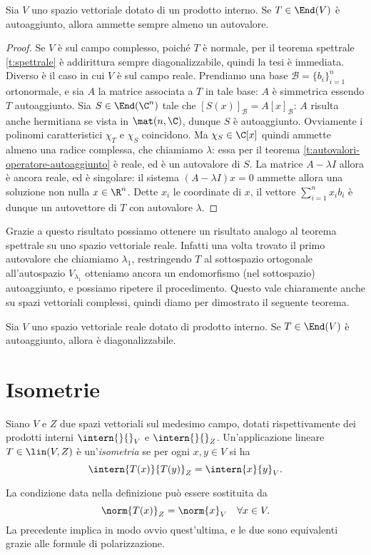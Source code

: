 \begin{teorema}
	Sia $V$ uno spazio vettoriale dotato di un prodotto interno.
	Se $T\in\End(V)$ è autoaggiunto, allora ammette sempre almeno un autovalore.
\end{teorema}
\begin{proof}
	Se $V$ è sul campo complesso, poich\'e $T$ è normale, per il teorema spettrale \ref{t:spettrale} è addirittura sempre diagonalizzabile, quindi la tesi è immediata.
	Diverso è il caso in cui $V$ è sul campo reale.
	Prendiamo una base $\mathcal B=\{b_i\}_{i=1}^n$ ortonormale, e sia $A$ la matrice associata a $T$ in tale base: $A$ è simmetrica essendo $T$ autoaggiunto.
	Sia $S\in\End(\C^n)$ tale che $[S(x)]_\mathcal{B}=A[x]_\mathcal{B}$: $A$ risulta anche hermitiana se vista in $\mat(n,\C)$, dunque $S$ è autoaggiunto.
	Ovviamente i polinomi caratteristici $\chi_T$ e $\chi_S$ coincidono.
	Ma $\chi_S\in\C[x]$ quindi ammette almeno una radice complessa, che chiamiamo $\lambda$: essa per il teorema \ref{t:autovalori-operatore-autoaggiunto} è reale, ed è un autovalore di $S$.
	La matrice $A-\lambda I$ allora è ancora reale, ed è singolare: il sistema $(A-\lambda I)x=0$ ammette allora una soluzione non nulla $x\in\R^n$.
	Dette $x_i$ le coordinate di $x$, il vettore $\sum_{i=1}^nx_ib_i$ è dunque un autovettore di $T$ con autovalore $\lambda$.
\end{proof}
Grazie a questo risultato possiamo ottenere un risultato analogo al teorema spettrale su uno spazio vettoriale reale.
Infatti una volta trovato il primo autovalore che chiamiamo $\lambda_1$, restringendo $T$ al sottospazio ortogonale all'autospazio $V_{\lambda_1}$ otteniamo ancora un endomorfismo (nel sottospazio) autoaggiunto, e possiamo ripetere il procedimento.
Questo vale chiaramente anche su spazi vettoriali complessi, quindi diamo per dimostrato il seguente teorema.
\begin{teorema} \label{t:spettrale-reale}
	Sia $V$ uno spazio vettoriale reale dotato di prodotto interno.
	Se $T\in\End(V)$ è autoaggiunto, allora è diagonalizzabile.
\end{teorema}

\section{Isometrie} \label{sec:isometrie}
\begin{definizione} \label{d:isometria}
	Siano $V$ e $Z$ due spazi vettoriali sul medesimo campo, dotati rispettivamente dei prodotti interni $\intern{}{}_V$ e $\intern{}{}_Z$.
	Un'applicazione lineare $T\in\lin(V,Z)$ è un'\emph{isometria} se per ogni $  x,  y\in V$ si ha
	\begin{equation*}
		\intern{T(  x)}{T(  y)}_Z=\intern{  x}{  y}_V.
	\end{equation*}
\end{definizione}
La condizione data nella definizione può essere sostituita da
\begin{equation}
	\norm{T(x)}_Z=\norm{x}_V\quad\forall x\in V.
\end{equation}
La precedente implica in modo ovvio quest'ultima, e le due sono equivalenti grazie alle formule di polarizzazione.

